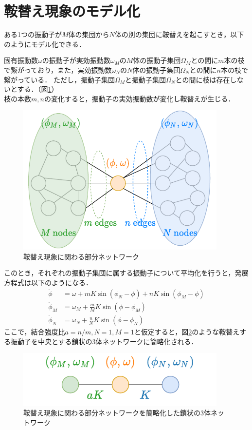 \documentclass[../main]{subfiles}
\begin{document}
\section{鞍替え現象のモデル化}
ある1つの振動子が$M$体の集団から$N$体の別の集団に鞍替えを起こすとき，以下のようにモデル化できる．
\begin{screen}
固有振動数$\omega$の振動子が実効振動数$\omega_M$の$M$体の振動子集団$\Omega_M$との間に$m$本の枝で繋がっており，また，実効振動数$\omega_N$の$N$体の振動子集団$\Omega_N$との間に$n$本の枝で繋がっている．
ただし，振動子集団$\Omega_M$と振動子集団$\Omega_N$との間に枝は存在しないとする．（図\ref{fig:switch}）\\
枝の本数$m,n$の変化すると，振動子の実効振動数が変化し鞍替えが生じる．
\end{screen}
\begin{figure}[t]
\centering
\includegraphics[width=105mm]{./images/three_obj_before.pdf}
\centering
\caption{鞍替え現象に関わる部分ネットワーク}
\label{fig:switch}
\end{figure}
このとき，それぞれの振動子集団に属する振動子について平均化を行うと，発展方程式は以下のようになる．
\begin{align*}
    \dot{\phi}&=\omega+mK\sin\left( \phi_N-\phi \right)+nK\sin\left( \phi_M-\phi \right)\\
    \dot{\phi}_M&=\omega_M+\frac{m}{M}K\sin\left( \phi-\phi_M \right) \\
    \dot{\phi}_N&=\omega_N+\frac{n}{N}K\sin\left( \phi-\phi_N \right)    
\end{align*}
ここで，結合強度比$a=n/m,N=1,M=1$と仮定すると，図\ref{fig:3body}のような鞍替えする振動子を中央とする鎖状の3体ネットワークに簡略化される．\\
\begin{figure}[t]
    \centering
    \includegraphics[width=105mm]{./images/three_obj_after.pdf}
    \centering
    \caption{鞍替え現象に関わる部分ネットワークを簡略化した鎖状の3体ネットワーク}
    \label{fig:3body}
\end{figure}
\end{document}
